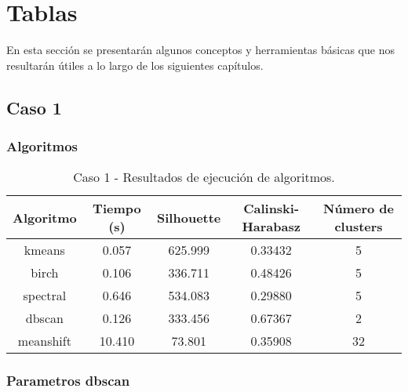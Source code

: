 
\chapter{Tablas}

En esta sección se presentarán algunos conceptos y herramientas básicas que nos resultarán útiles a lo largo de los siguientes capítulos.

\section{Caso 1}

\subsection{Algoritmos}

\begin{table}[H]
\centering
\caption{Caso 1 - Resultados de ejecución de algoritmos.}
\label{tab:c1_alg}
\begin{tabular}{ccccc}
\toprule
 Algoritmo & Tiempo (s) & Silhouette & Calinski-Harabasz & Número de clusters \\
\midrule
kmeans & 0.057 & 625.999 & 0.33432 & 5 \\
birch & 0.106 & 336.711 & 0.48426 & 5 \\
spectral & 0.646 & 534.083 & 0.29880 & 5 \\
dbscan & 0.126 & 333.456 & 0.67367 & 2 \\
meanshift & 10.410 & 73.801 & 0.35908 & 32 \\
\bottomrule
\end{tabular}
\end{table}

\subsection{Parametros dbscan}

